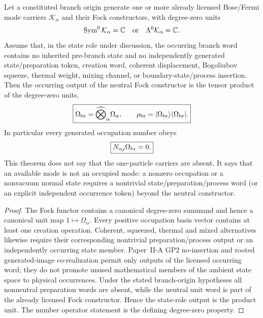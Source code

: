 \documentclass[12pt,a4paper]{article}
\begin{document}
\begin{theorem}
\label{p4:thm:v2114-neutral-fock-unit}
Let a constituted branch origin generate one or more already licensed
Bose/Fermi mode carriers \(\mathcal K_\alpha\) and their Fock constructors,
with degree-zero units
\[
 \operatorname{Sym}^0\mathcal K_\alpha=\mathbb C
 \quad\hbox{or}\quad
 \Lambda^0\mathcal K_\alpha=\mathbb C .
\]
Assume that, in the state role under discussion, the occurring branch word
contains no inherited pre-branch state and no independently generated
state/preparation token, creation word, coherent displacement, Bogoliubov
squeeze, thermal weight, mixing channel, or boundary-state/process insertion.
Then the occurring output of the neutral Fock constructor is the tensor
product of the degree-zero units,
\[
 \boxed{\Omega_{\rm br}=\widehat\bigotimes_\alpha\Omega_\alpha,
 \qquad \rho_{\rm br}=|\Omega_{\rm br}\rangle
                    \langle\Omega_{\rm br}|.}
\]
In particular every generated occupation number obeys
\[
 \boxed{N_{\alpha j}\Omega_{\rm br}=0.}
\]
This theorem does not say that the one-particle carriers are absent.  It says
that an available mode is not an occupied mode: a nonzero occupation or a
nonvacuum normal state requires a nontrivial state/preparation/process word
(or an explicit independent occurrence token) beyond the neutral constructor.
\end{theorem}

\begin{proof}
The Fock functor contains a canonical degree-zero summand and hence a canonical
unit map \(1\mapsto\Omega_\alpha\).  Every positive occupation basis vector
contains at least one creation operation.  Coherent, squeezed, thermal and
mixed alternatives likewise require their corresponding nontrivial
preparation/process output or an independently occurring state member.
Paper~II-A GP2 no-insertion and rooted generated-image co-realization permit
only outputs of the licensed occurring word; they do not promote unused
mathematical members of the ambient state space to physical occurrences.
Under the stated branch-origin hypotheses all nonneutral preparation words
are absent, while the neutral unit word is part of the already licensed Fock
constructor.  Hence the state-role output is the product unit.  The number
operator statement is the defining degree-zero property.
\end{proof}
\end{document}
